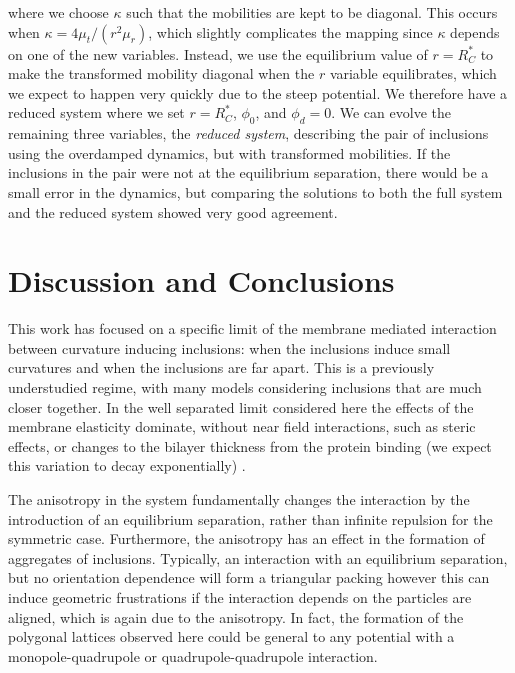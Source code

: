 {where we choose $\kappa$ such that the mobilities are kept to be diagonal. This occurs when $\kappa = 4\mu_t/(r^2\mu_r)$, which slightly complicates the mapping since $\kappa$ depends on one of the new variables. Instead, we use the equilibrium value of $r=R^*_C$ to make the transformed mobility diagonal when the $r$ variable equilibrates, which we expect to happen very quickly due to the steep potential. We therefore have a reduced system where we set $r=R^*_C$, $\phi_0$, and $\phi_d=0$. We can evolve the remaining three variables, the \textit{reduced system}, describing the pair of inclusions using the overdamped dynamics, but with transformed mobilities. If the inclusions in the pair were not at the equilibrium separation, there would be a small error in the dynamics, but comparing the solutions to both the full system and the reduced system showed very good agreement.
}

\section{Discussion and Conclusions}

This work has focused on a specific limit of the membrane mediated interaction between curvature inducing inclusions: when the inclusions induce small curvatures and when the inclusions are far apart. This is a previously understudied regime, with many models considering inclusions that are much closer together. In the well separated limit considered here the effects of the membrane elasticity dominate, without near field interactions, such as steric effects, or changes to the bilayer thickness from the protein binding (we expect this variation to decay exponentially) .

The anisotropy in the system fundamentally changes the interaction by the introduction of an equilibrium separation, rather than infinite repulsion for the symmetric case. Furthermore, the anisotropy has an effect in the formation of aggregates of inclusions. Typically, an interaction with an equilibrium separation, but no orientation dependence will form a triangular packing  however this can induce geometric frustrations if the interaction depends on the particles are aligned, which is again due to the anisotropy. In fact, the formation of the polygonal lattices observed here could be general to any potential with a monopole-quadrupole or quadrupole-quadrupole interaction.


